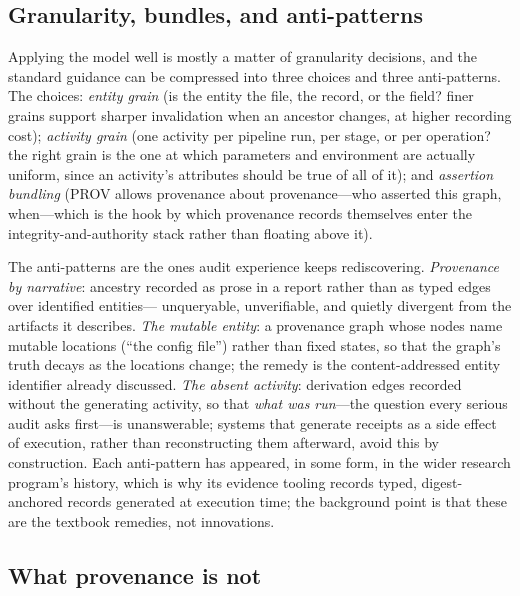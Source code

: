 \subsection{Granularity, bundles, and anti-patterns}\label{ch02:prov-granularity}

Applying the model well is mostly a matter of granularity decisions,
and the standard guidance can be compressed into three choices and
three anti-patterns. The choices: \emph{entity grain} (is the entity
the file, the record, or the field? finer grains support sharper
invalidation when an ancestor changes, at higher recording cost);
\emph{activity grain} (one activity per pipeline run, per stage, or
per operation? the right grain is the one at which parameters and
environment are actually uniform, since an activity's attributes
should be true of all of it); and \emph{assertion bundling} (PROV
allows provenance about provenance---who asserted this graph,
when---which is the hook by which provenance records themselves
enter the integrity-and-authority stack rather than floating above
it).

The anti-patterns are the ones audit experience keeps rediscovering.
\emph{Provenance by narrative}: ancestry recorded as prose in a
report rather than as typed edges over identified entities---
unqueryable, unverifiable, and quietly divergent from the artifacts
it describes. \emph{The mutable entity}: a provenance graph whose
nodes name mutable locations (``the config file'') rather than fixed
states, so that the graph's truth decays as the locations change;
the remedy is the content-addressed entity identifier already
discussed. \emph{The absent activity}: derivation edges recorded
without the generating activity, so that \emph{what was run}---the
question every serious audit asks first---is unanswerable; systems
that generate receipts as a side effect of execution, rather than
reconstructing them afterward, avoid this by construction. Each
anti-pattern has appeared, in some form, in the wider research
program's history, which is why its evidence tooling records typed,
digest-anchored records generated at execution time; the background
point is that these are the textbook remedies, not innovations.

\subsection{What provenance is not}\label{ch02:prov-limits}

